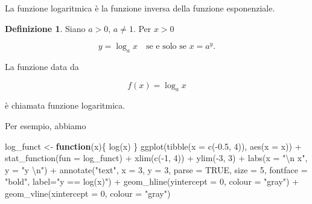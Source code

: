 \documentclass[
  11pt,
]{krantz}
\makeatletter
\newenvironment{Shaded}{\begin{snugshade}}{\end{snugshade}}
\newcommand{\AttributeTok}[1]{\textcolor[rgb]{0.61,0.61,0.61}{#1}}
\newcommand{\ConstantTok}[1]{\textcolor[rgb]{0,0,0}{#1}}
\newcommand{\ControlFlowTok}[1]{\textcolor[rgb]{0.27,0.27,0.27}{\textbf{#1}}}
\newcommand{\DecValTok}[1]{\textcolor[rgb]{0.06,0.06,0.06}{#1}}
\newcommand{\FloatTok}[1]{\textcolor[rgb]{0.06,0.06,0.06}{#1}}
\newcommand{\FunctionTok}[1]{\textcolor[rgb]{0,0,0}{#1}}
\newcommand{\NormalTok}[1]{#1}
\newcommand{\OtherTok}[1]{\textcolor[rgb]{0.37,0.37,0.37}{#1}}
\newcommand{\SpecialCharTok}[1]{\textcolor[rgb]{0,0,0}{#1}}
\newcommand{\StringTok}[1]{\textcolor[rgb]{0.5,0.5,0.5}{#1}}
\newenvironment{kframe}{%
\medskip{}
\setlength{\fboxsep}{.8em}
 \def\at@end@of@kframe{}%
 \ifinner\ifhmode%
  \def\at@end@of@kframe{\end{minipage}}%
  \begin{minipage}{\columnwidth}%
 \fi\fi%
 \def\FrameCommand##1{\hskip\@totalleftmargin \hskip-\fboxsep
 \colorbox{shadecolor}{##1}\hskip-\fboxsep
     \hskip-\linewidth \hskip-\@totalleftmargin \hskip\columnwidth}%
 \MakeFramed {\advance\hsize-\width
   \@totalleftmargin\z@ \linewidth\hsize
   \@setminipage}}%
 {\par\unskip\endMakeFramed%
 \at@end@of@kframe}
\renewenvironment{Shaded}{\begin{kframe}}{\end{kframe}}
\theoremstyle{definition}
\newtheorem{definition}{Definizione}[chapter]
\theoremstyle{definition}
\theoremstyle{definition}
\theoremstyle{definition}
\theoremstyle{remark}
\makeatother
\begin{document}
La funzione logaritmica è la funzione inversa della funzione esponenziale.

\begin{definition}
Siano \(a > 0\), \(a \neq 1\). Per \(x > 0\)

\begin{equation}
y = \log_a x \quad \text{se e solo se } x = a^y.
\end{equation}

La funzione data da

\begin{equation}
f(x) = \log_a x
\end{equation}

è chiamata funzione logaritmica.
\end{definition}

Per esempio, abbiamo

\begin{Shaded}
\begin{Highlighting}[]
\NormalTok{log\_funct }\OtherTok{\textless{}{-}} \ControlFlowTok{function}\NormalTok{(x)\{}
  \FunctionTok{log}\NormalTok{(x)}
\NormalTok{\}}
\FunctionTok{ggplot}\NormalTok{(}\FunctionTok{tibble}\NormalTok{(}\AttributeTok{x =} \FunctionTok{c}\NormalTok{(}\SpecialCharTok{{-}}\FloatTok{0.5}\NormalTok{, }\DecValTok{4}\NormalTok{)), }\FunctionTok{aes}\NormalTok{(}\AttributeTok{x =}\NormalTok{ x)) }\SpecialCharTok{+}
  \FunctionTok{stat\_function}\NormalTok{(}\AttributeTok{fun =}\NormalTok{ log\_funct) }\SpecialCharTok{+} 
  \FunctionTok{xlim}\NormalTok{(}\FunctionTok{c}\NormalTok{(}\SpecialCharTok{{-}}\DecValTok{1}\NormalTok{, }\DecValTok{4}\NormalTok{)) }\SpecialCharTok{+} 
  \FunctionTok{ylim}\NormalTok{(}\SpecialCharTok{{-}}\DecValTok{3}\NormalTok{, }\DecValTok{3}\NormalTok{) }\SpecialCharTok{+}
  \FunctionTok{labs}\NormalTok{(}\AttributeTok{x =} \StringTok{"}\SpecialCharTok{\textbackslash{}n}\StringTok{ x"}\NormalTok{, }\AttributeTok{y =} \StringTok{"y }\SpecialCharTok{\textbackslash{}n}\StringTok{"}\NormalTok{) }\SpecialCharTok{+}
  \FunctionTok{annotate}\NormalTok{(}\StringTok{"text"}\NormalTok{, }\AttributeTok{x =} \DecValTok{3}\NormalTok{, }\AttributeTok{y =} \DecValTok{3}\NormalTok{, }\AttributeTok{parse =} \ConstantTok{TRUE}\NormalTok{, }\AttributeTok{size =} \DecValTok{5}\NormalTok{, }\AttributeTok{fontface =} \StringTok{"bold"}\NormalTok{,}
           \AttributeTok{label=}\StringTok{"y == log(x)"}\NormalTok{) }\SpecialCharTok{+} 
  \FunctionTok{geom\_hline}\NormalTok{(}\AttributeTok{yintercept =} \DecValTok{0}\NormalTok{, }\AttributeTok{colour =} \StringTok{"gray"}\NormalTok{) }\SpecialCharTok{+}
  \FunctionTok{geom\_vline}\NormalTok{(}\AttributeTok{xintercept =} \DecValTok{0}\NormalTok{, }\AttributeTok{colour =} \StringTok{"gray"}\NormalTok{)}
\end{Highlighting}
\end{Shaded}
\end{document}
